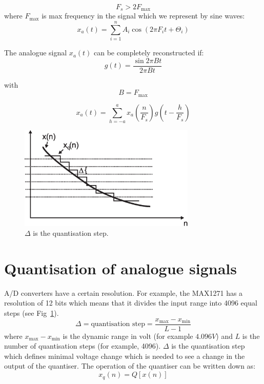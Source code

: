 \documentclass[12pt,a4paper]{article}
\begin{document}
\begin{equation}
F_s > 2 F_{\mbox{max}}
\end{equation}
where $F_{\mbox{max}}$ is max frequency in the signal which we
represent by sine waves:
\begin{equation}
x_{a}(t) = \sum_{i=1}^{n} A_i \cos (2 \pi F_{i}t  + \Theta_{i})
\end{equation}

The analogue signal $x_{a}(t)$ can be completely reconstructed if:
\begin{equation}
g(t) = \frac{\sin 2\pi Bt}{2 \pi Bt}
\end{equation}

with
\begin{equation}
B = F_{\mbox{max}}
\end{equation}

\begin{equation}
x_{a}(t) = \sum_{h= -a}^{a}x_{a}(\frac{n}{F_s})g(t - \frac{h}{F_s})
\end{equation}




\begin{figure}[!hbt]
\begin{center}
\mbox{\includegraphics[width=0.75\textwidth]{quant_overv}}
\end{center}
\caption{$\Delta$ is the quantisation step.
\label{quant_overv}}
\end{figure}



\section{Quantisation of analogue signals}
A/D converters have a certain resolution. For example, the MAX1271 has a
resolution of 12 bits which means that it divides the input range into
4096 equal steps (see Fig~\ref{quant_overv}).
\begin{equation}
\Delta = \mbox{quantisation step} = 
\frac{x_{\mbox{max}} - x_{\mbox{min}}}{L - 1}
\end{equation}
where $x_{\mbox{max}} - x_{\mbox{min}}$ is the dynamic range in volt
(for example $4.096V$) and $L$ is the number of quantisation steps
(for example, 4096). $\Delta$ is the quantisation step which defines
minimal voltage change which is needed to see a change in the output
of the quantiser. The operation of the quantiser can be written down
as:
\begin{equation}
x_{q}(n) = Q[x(n)]
\end{equation}
\end{document}
